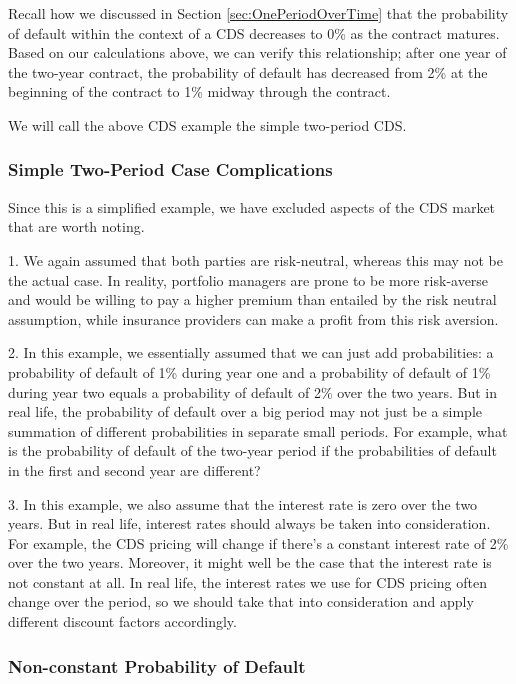 \documentclass{jss}
\begin{document}
Recall how we discussed in Section \ref{sec:OnePeriodOverTime} that the probability of default within the context of a CDS decreases to 0\% as the contract matures. Based on our calculations above, we can verify this relationship; after one year of the two-year contract, the probability of default has decreased from 2\% at the beginning of the contract to 1\% midway through the contract.

We will call the above CDS example the simple two-period CDS.

\subsubsection{Simple Two-Period Case Complications}

Since this is a simplified example, we have excluded aspects of the CDS market that are worth noting.

1. We again assumed that both parties are risk-neutral, whereas this may not be the actual case. In reality, portfolio managers are prone to be more risk-averse and would be willing to pay a higher premium than entailed by the risk neutral assumption, while insurance providers can make a profit from this risk aversion.

2. In this example, we essentially assumed that we can just add probabilities: a probability of default of 1\% during year one and a probability of default of 1\% during year two equals a probability of default of 2\% over the two years. But in real life, the probability of default over a big period may not just be a simple summation of different probabilities in separate small periods. For example, what is the probability of default of the two-year period if the probabilities of default in the first and second year are different?

3. In this example, we also assume that the interest rate is zero over the two years. But in real life, interest rates should always be taken into consideration. For example, the CDS pricing will change if there's a constant interest rate of 2\% over the two years. Moreover, it might well be the case that the interest rate is not constant at all. In real life, the interest rates we use for CDS pricing often change over the period, so we should take that into consideration and apply different discount factors accordingly.

\subsubsection{Non-constant Probability of Default}
\end{document}
